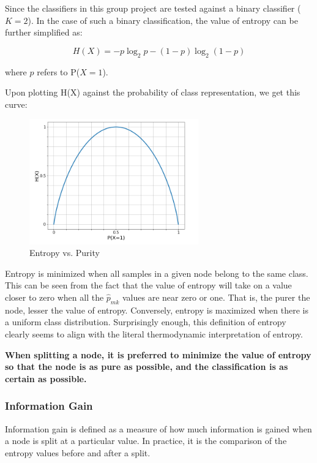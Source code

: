 Since the classifiers in this group project are tested against a binary classifier ($K=2$). In the case of such a binary classification, the value of entropy can be further simplified as:

$$
    H(X) = -p \log_2 p - (1 - p) \log_2 (1 - p)
$$

where $p$ refers to P($X = 1$).

Upon plotting H(X) against the probability of class representation, we get this curve:

\begin{figure}[H]
    \centering
    \includegraphics[width=0.65\textwidth]{entropy.png}
    \caption{Entropy vs. Purity}
\end{figure}


Entropy is minimized when all samples in a given node belong to the same class. This can be seen from the fact that the value of entropy will take on a value closer to zero when all the $\hat{p}_{mk}$ values are near zero or one.
That is, the purer the node, lesser the value of entropy.
Conversely, entropy is maximized when there is a uniform class distribution. Surprisingly enough, this definition of entropy clearly seems to align with the literal thermodynamic interpretation of entropy.

\textbf{When splitting a node, it is preferred to minimize the value of entropy so that the node is as pure as possible, and the classification is as certain as possible.}

\subsubsection{Information Gain}

Information gain is defined as a measure of how much information is gained when a node is split at a particular value. In practice, it is the comparison of the entropy values before and after a split.

